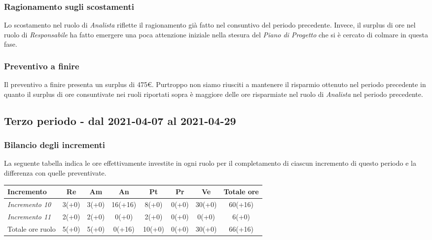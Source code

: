 {{{{{{{{{{		\subsubsection{Ragionamento sugli scostamenti}\label{ConsuntivoSecondoPeriodoDiProgettazioneDiDettaglioCodificaRagionamentoScostamenti}
		Lo scostamento nel ruolo di \textit{Analista} riflette il ragionamento già fatto nel consuntivo del periodo precedente.
		Invece, il surplus di ore nel ruolo di \textit{Responsabile} ha fatto emergere una poca attenzione iniziale nella stesura del \textit{Piano di Progetto} che si è cercato di colmare in questa fase.

		\subsubsection{Preventivo a finire}\label{ConsuntivoSecondoPeriodoDiProgettazioneDiDettaglioCodificaPreventivoFinire}
		Il preventivo a finire presenta un surplus di 475\euro.
		Purtroppo non siamo riusciti a mantenere il risparmio ottenuto nel periodo precedente in quanto il surplus di ore consuntivate nei ruoli riportati sopra è maggiore delle ore risparmiate nel ruolo di \textit{Analista} nel periodo precedente.

\subsection{Terzo periodo - dal 2021-04-07 al 2021-04-29} }\label{ConsuntivoTerzoPeriodoDiProgettazioneDiDettaglioCodifica}

\subsubsection{Bilancio degli incrementi}\label{ConsuntivoTerzoPeriodoDiProgettazioneDiDettaglioCodificaIncrementi}

La seguente tabella indica le ore effettivamente investite in ogni ruolo per il completamento di ciascun incremento di questo periodo e la differenza con quelle preventivate.

\quad
\def\tabularxcolumn#1{m{#1}}
{

	\begin{center}
		\renewcommand{\arraystretch}{1.4}
		\begin{tabularx}{\textwidth}{|X|c|c|c|c|c|c|c|}
			\hline
			\rowcolor{airforceblue}
			\textbf{Incremento} & \textbf{Re} & \textbf{Am} & \textbf{An} & \textbf{Pt} & \textbf{Pr} & \textbf{Ve} & \textbf{Totale ore}\\
			\hline
			\textit{Incremento 10} & 3(+0) & 3(+0) & 16(+16) & 8(+0) & 0(+0) & 30(+0) & 60(+16)\\
			\hline
			\textit{Incremento 11} & 2(+0) & 2(+0) & 0(+0) & 2(+0) & 0(+0) & 0(+0) & 6(+0)\\
			\hline
			Totale ore ruolo & 5(+0) & 5(+0) & 0(+16) & 10(+0) & 0(+0) & 30(+0) & 66(+16)\\
			\hline
		\end{tabularx}
	\end{center}


}}}}}}}}}}
